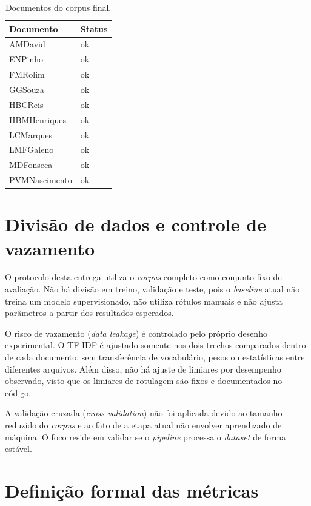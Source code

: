 \documentclass[12pt]{article}
\begin{document}
\begin{table}[h]
    \centering
    \begin{tabular}{ll}
        \toprule
        Documento & Status \\
        \midrule
        AMDavid & ok \\
        ENPinho & ok \\
        FMRolim & ok \\
        GGSouza & ok \\
        HBCReis & ok \\
        HBMHenriques & ok \\
        LCMarques & ok \\
        LMFGaleno & ok \\
        MDFonseca & ok \\
        PVMNascimento & ok \\
        \bottomrule
    \end{tabular}
    \caption{Documentos do corpus final.}
\end{table}

\section{Divisão de dados e controle de vazamento}

O protocolo desta entrega utiliza o \textit{corpus} completo como conjunto fixo de avaliação. Não há divisão em treino, validação e teste, pois o \textit{baseline} atual não treina um modelo supervisionado, não utiliza rótulos manuais e não ajusta parâmetros a partir dos resultados esperados.

O risco de vazamento (\textit{data leakage}) é controlado pelo próprio desenho experimental. O TF-IDF é ajustado somente nos dois trechos comparados dentro de cada documento, sem transferência de vocabulário, pesos ou estatísticas entre diferentes arquivos. Além disso, não há ajuste de limiares por desempenho observado, visto que os limiares de rotulagem são fixos e documentados no código.

A validação cruzada (\textit{cross-validation}) não foi aplicada devido ao tamanho reduzido do \textit{corpus} e ao fato de a etapa atual não envolver aprendizado de máquina. O foco reside em validar se o \textit{pipeline} processa o \textit{dataset} de forma estável.

\section{Definição formal das métricas}
\end{document}
